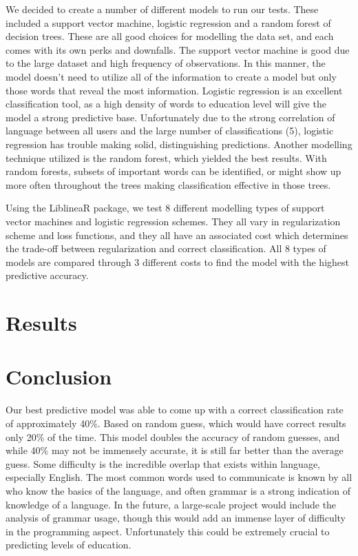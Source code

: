 \documentclass[a4paper,12pt]{article}
\begin{document}
We decided to create a number of different models to run our tests. These included a support vector machine, logistic regression and a random forest of decision trees. These are all good choices for modelling the data set, and each comes with its own perks and downfalls. The support vector machine is good due to the large dataset and high frequency of observations. In this manner, the model doesn't need to utilize all of the information to create a model but only those words that reveal the most information. Logistic regression is an excellent classification tool, as a high density of words to education level will give the model a strong predictive base. Unfortunately due to the strong correlation of language between all users and the large number of classifications (5), logistic regression has trouble making solid, distinguishing predictions. Another modelling technique utilized is the random forest, which yielded the best results. With random forests, subsets of important words can be identified, or might show up more often throughout the trees making classification effective in those trees.

Using the LiblineaR package, we test 8 different modelling types of support vector machines and logistic regression schemes. They all vary in regularization scheme and loss functions, and they all have an associated cost which determines the trade-off between regularization and correct classification. All 8 types of models are compared through 3 different costs to find the model with the highest predictive accuracy.


\section{Results}


\section{Conclusion}

Our best predictive model was able to come up with a correct classification rate of approximately 40\%. Based on random guess, which would have correct results only 20\% of the time. This model doubles the accuracy of random guesses, and while 40\% may not be immensely accurate, it is still far better than the average guess. Some difficulty is the incredible overlap that exists within language, especially English. The most common words used to communicate is known by all who know the basics of the language, and often grammar is a strong indication of knowledge of a language. In the future, a large-scale project would include the analysis of grammar usage, though this would add an immense layer of difficulty in the programming aspect. Unfortunately this could be extremely crucial to predicting levels of education.
\end{document}
